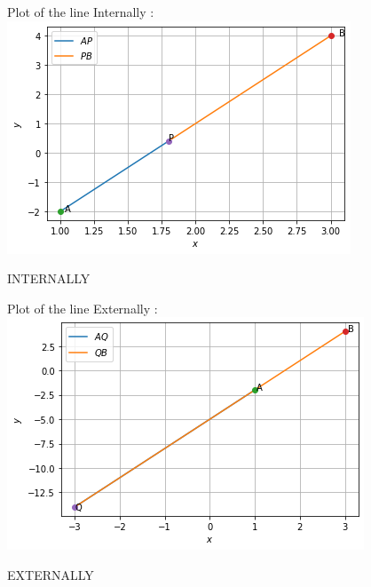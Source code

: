 \documentclass[journal,12pt,twocolumn]{IEEEtran}
\begin{document}
\begin{figure}[H]
Plot of the line Internally :
    \centering
\includegraphics[width=\columnwidth]{internally.png}
    \caption{INTERNALLY}
    \label{fig:Internally.}
\end{figure} 
\begin{figure}[H]
Plot of the line Externally :
    \centering
\includegraphics[width=\columnwidth]{externally.png}
    \caption{EXTERNALLY}
    \label{fig:EXTERNALLY.}
\end{figure}  
\end{document}
